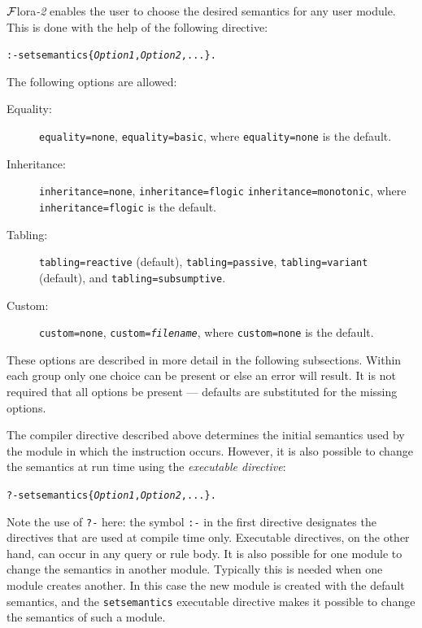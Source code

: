 \documentclass[11pt]{article}
\newcommand{\FLORA}{{\mbox{\sc ${\cal F}${lora}\rm\emph{-2}}}\xspace}
\newcommand{\FLSYSTEM}{\FLORA}
\begin{document}
\FLSYSTEM enables the user to choose the desired semantics for any user
module. This is done with the help of the following directive:
\begin{alltt}
  :- setsemantics\{\emph{Option1}, \emph{Option2}, ...\}.
\end{alltt}
The following options are allowed:
\begin{description}
  \item[Equality:]  {\tt equality=none}, {\tt equality=basic}, where
  {\tt equality=none} is the default.
\item[Inheritance:] {\tt inheritance=none}, {\tt inheritance=flogic}
  \texttt{inheritance=monotonic},  where
  {\tt inheritance=flogic} is the default.
\item[Tabling:] \texttt{tabling=reactive} (default),
  \texttt{tabling=passive}, \texttt{tabling=variant} (default), and
  \texttt{tabling=subsumptive}.
\item[Custom:] {\tt custom=none}, {\tt custom=\emph{filename}}, where
  {\tt custom=none} is the default.
\end{description}
These options are described in more detail in the following
subsections.
Within each group only one choice can be present or else an error will result.
It is not required that all options be present --- defaults are substituted
for the missing options.

The compiler directive described above determines the initial semantics used
by the module in which the instruction occurs. However, it is also possible
to change the semantics at run time using the \emph{executable directive}:
\begin{alltt}
    ?- setsemantics\{\emph{Option1}, \emph{Option2}, ...\}.
\end{alltt}
Note the use of {\tt ?-} here: the symbol {\tt :-} in the first directive
designates the directives that are used at compile time only.  Executable
directives, on the other hand, can occur in any query or rule body.  It is
also possible for one module to change the semantics in another module.
Typically this is needed when one module creates another. In this case the
new module is created with the default semantics, and the {\tt setsemantics}
executable directive makes it possible to change the semantics of such a
module.
\end{document}
